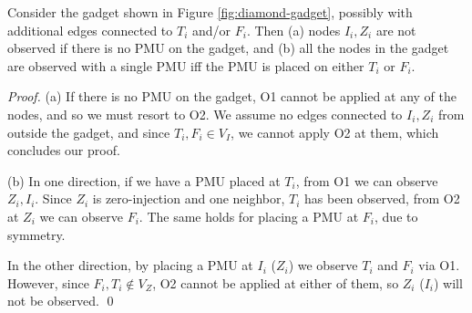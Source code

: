 \begin{lemma}\label{lem:property1}
Consider the gadget shown in Figure \ref{fig:diamond-gadget}, possibly with additional edges connected to $T_i$ and/or $F_i$. Then (a) nodes $I_i, Z_i$ are not observed if there is no PMU on the gadget, and (b) all the nodes in the gadget are observed with a single PMU iff the PMU is placed on either $T_i$ or $F_i$.
\end{lemma}
\begin{proof}
(a) If there is no PMU on the gadget, O1 cannot be applied at any of the nodes, and so we must resort to O2. We assume no edges connected to $I_i,Z_i$ from outside the gadget, and since $T_i,F_i\in V_I$, we cannot apply O2 at them, which concludes our proof.
 
(b) In one direction, if we have a PMU placed at $T_i$, from O1 we can observe $Z_i,I_i$. Since $Z_i$ is zero-injection and one neighbor, $T_i$ has been observed, from O2 at $Z_i$ we can observe $F_i$. The same holds for placing a PMU at $F_i$, due to symmetry.

In the other direction, by placing a PMU at $I_i$ ($Z_i$) we observe $T_i$ and $F_i$ via O1. However, since $F_i,T_i\notin V_Z$, O2 cannot be applied at either of them, so $Z_i$ ($I_i$) will not be observed. \qed
\end{proof}

